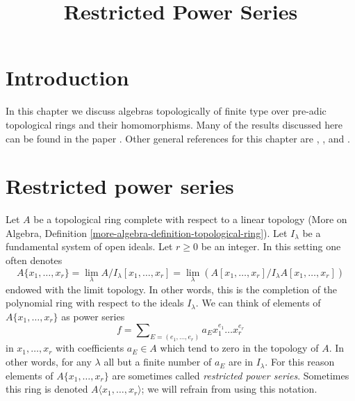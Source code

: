 

%


\title{Restricted Power Series}


\maketitle

\label{section-phantom}

\tableofcontents

\section{Introduction}
\label{section-introduction}

\noindent
In this chapter we discuss algebras topologically of finite type
over pre-adic topological rings and their homomorphisms. Many of
the results discussed here can be found in the paper \cite{Elkik}.
Other general references for this chapter are \cite{EGA}, \cite{Abbes},
and \cite{Fujiwara-Kato}.




\section{Restricted power series}
\label{section-restricted-power-series}

\noindent
Let $A$ be a topological ring complete with respect to a linear
topology (More on Algebra, Definition
\ref{more-algebra-definition-topological-ring}).
Let $I_\lambda$ be a fundamental system of open ideals.
Let $r \geq 0$ be an integer. In this setting one often
denotes
$$
A\{x_1, \ldots, x_r\} =
\lim_\lambda A/I_\lambda[x_1, \ldots, x_r] =
\lim_\lambda (A[x_1, \ldots, x_r]/I_\lambda A[x_1, \ldots, x_r])
$$
endowed with the limit topology. In other words, this is
the completion of the polynomial ring with respect to the
ideals $I_\lambda$. We can think of elements of $A\{x_1, \ldots, x_r\}$ as
power series
$$
f = \sum\nolimits_{E = (e_1, \ldots, e_r)} a_E x_1^{e_1} \ldots x_r^{e_r}
$$
in $x_1, \ldots, x_r$ with coefficients $a_E \in A$ which tend
to zero in the topology of $A$. In other words, for any $\lambda$
all but a finite number of $a_E$ are in $I_\lambda$.
For this reason elements of $A\{x_1, \ldots, x_r\}$ are sometimes
called {\it restricted power series}.
Sometimes this ring is denoted $A\langle x_1, \ldots, x_r\rangle$;
we will refrain from using this notation.


